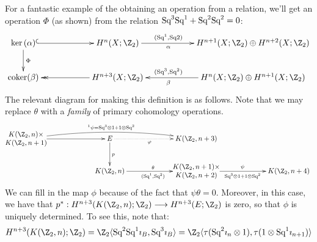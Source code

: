 \documentclass[11pt]{article}
\begin{document}
For a fantastic example of the obtaining an operation from a relation, we'll get
an operation $\Phi$ (as shown) from the relation $\textup{Sq}^3\textup{Sq}^1+\textup{Sq}^2\textup{Sq}^2=0$:
\[\xymatrix@C=2cm{
\ker(\alpha)\ar@{^{(}->}[r]\ar[d]^\Phi&
H^n(X;\Z_2)\ar[r]_{\alpha\qquad\qquad}^{(\Squ^1,\Squ2)\qquad\qquad}&
H^{n+1}(X;\Z_2)\oplus H^{n+2}(X;\Z_2)\\
\coker(\beta)&H^{n+3}(X;\Z_2)\ar@{->>}[l]&
\ar[l]_{(\Squ^3,\Squ^2)\qquad\qquad}^{\beta\qquad\qquad}
H^{n}(X;\Z_2)\oplus H^{n+1}(X;\Z_2)
}\]
The relevant diagram for making this definition is as follows. Note that we may
replace $\theta$ with a \emph{family} of primary cohomology operations.
\[\xymatrix@C=2.3cm{
*\txt{$K(\Z_2,n)\times$\\$K(\Z_2,n+1)$}\ar[r]
\ar@/^.8pc/[rr]^{^1\psi=\Squ^3\otimes1+1\otimes\Squ^2}&
E\ar@{.>}[r]_{\phi\ \ \ }\ar[d]^p&K(\Z_2,n+3)\\
&
K(\Z_2,n)\ar[r]^\theta_{(\Squ^1,\Squ^2)}&
*\txt{$K(\Z_2,n+1)\times$\\$K(\Z_2,n+2)$}
\ar[r]^\psi_{\Squ^3\otimes1+1\otimes\Squ^2}&
K(\Z_2,n+4)
}\]
We can fill in the map $\phi$ because of the fact that $\psi\theta=0$. Moreover,
in this case, we have that $p^*:H^{n+3}(K(\Z_2,n);\Z_2)\to H^{n+3}(E;\Z_2)$ is
zero, so that $\phi$ is uniquely determined. To see this, note that:
\[H^{n+3}(K(\Z_2,n);\Z_2)=\Z_2\langle\Squ^2\Squ^1\imath_B,\Squ^3\imath_B\rangle
=\Z_2\langle\tau(\Squ^2\imath_{n}\otimes1),
\tau(1\otimes\Squ^1\imath_{n+1})\rangle
\]
\end{document}
